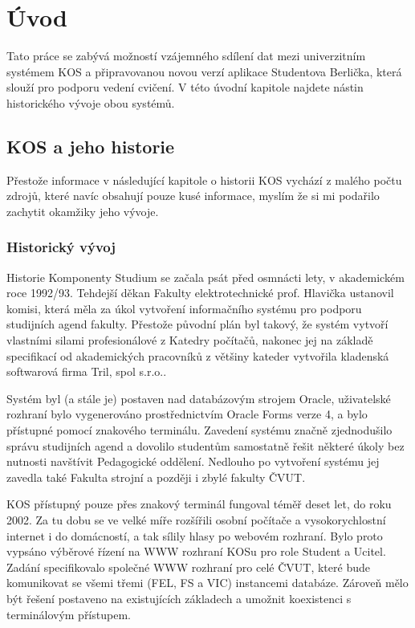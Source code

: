 \documentclass[11pt,twoside,a4paper]{book}
\begin{document}
\chapter{Úvod}

Tato práce se zabývá možností vzájemného sdílení dat mezi univerzitním systémem KOS a připravovanou novou verzí aplikace Studentova Berlička, která slouží pro podporu vedení cvičení. V této úvodní kapitole najdete nástin historického vývoje obou systémů.

\section{KOS a jeho historie}
Přestože informace v následující kapitole o historii KOS vychází z malého počtu zdrojů, které navíc obsahují pouze kusé informace, myslím že si mi podařilo zachytit okamžiky jeho vývoje.

\subsection{Historický vývoj}
Historie Komponenty Studium se začala psát před osmnácti lety, v akademickém roce 1992/93\cite{forum:historie-kos}. Tehdejší děkan Fakulty elektrotechnické prof. Hlavička ustanovil komisi, která měla za úkol vytvoření informačního systému pro podporu studijních agend fakulty. Přestože původní plán byl takový, že systém vytvoří vlastními silami profesionálové z Katedry počítačů, nakonec jej na základě specifikací od akademických pracovníků z většiny kateder vytvořila kladenská softwarová firma Tril, spol s.r.o.\cite{forum:neocekavana}.

Systém byl (a stále je) postaven nad databázovým strojem Oracle, uživatelské rozhraní bylo vygenerováno prostřednictvím Oracle Forms verze 4, a bylo přístupné pomocí znakového terminálu. Zavedení systému značně zjednodušilo správu studijních agend a dovolilo studentům samostatně řešit některé úkoly bez nutnosti navštívit Pedagogické oddělení. Nedlouho po vytvoření systému jej zavedla také Fakulta strojní a později i zbylé fakulty ČVUT.

KOS přístupný pouze přes znakový terminál fungoval téměř deset let, do roku 2002. Za tu dobu se ve velké míře rozšířili osobní počítače a vysokorychlostní internet i do domácností, a tak sílily hlasy po webovém rozhraní. Bylo proto vypsáno výběrové řízení na WWW rozhraní KOSu pro role Student a Ucitel. Zadání specifikovalo společné WWW rozhraní pro celé ČVUT, které bude komunikovat se všemi třemi (FEL, FS a VIC) instancemi  databáze. Zároveň mělo být řešení postaveno na existujících základech a umožnit koexistenci s terminálovým přístupem. 
\end{document}
